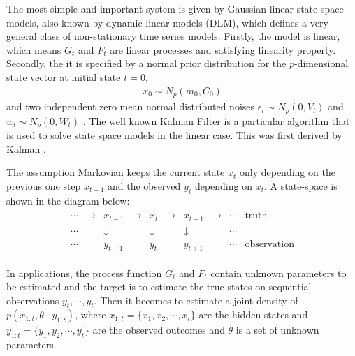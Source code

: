 The most simple and important system is given by Gaussian linear state space models, also known by dynamic linear models (DLM), which defines a very general class of non-stationary time series models.  Firstly, the model is linear, which means $G_t$ and $F_t$ are linear processes and satisfying linearity property. Secondly, the it is specified by a normal prior distribution for the $p$-dimensional state vector at initial state $t=0$, 
\begin{align*}
x_0 \sim N_p(m_0,C_0)
\end{align*} 
and two independent zero mean normal distributed noises $\epsilon_t \sim N_p(0,V_t)$ and $w_t \sim N_p(0,W_t)$ \cite{petris2009dynamic}. The well known Kalman Filter is a particular algorithm that is used to solve state space models in the linear case. This was first derived by Kalman \cite{kalman1960new}.

The assumption Markovian keeps the current state $x_t$ only depending on the previous one step $x_{t-1}$ and the observed $y_t$ depending on $x_t$. A state-space is shown in the diagram below:
\begin{align*}
{\displaystyle {\begin{array}{cccccccccc}\cdots &\to &x_{t-1}&\to &x_{t}&\to &x_{t+1}&\to &\cdots &{\text{truth}}\\ \cdots &&\downarrow &&\downarrow &&\downarrow &&\cdots &\\ \cdots&&y_{t-1}&&y_{t}&&y_{t+1}&&\cdots &{\text{observation}}\end{array}}}
\end{align*}

In applications, the process function $G_t$ and $F_t$ contain unknown parameters to be estimated \cite{de1988likelihood} and the target is to estimate the true states on sequential observations $y_t, \cdots, y_t$. Then it becomes to estimate a joint density of $p(x_{1:t},\theta \mid y_{1:t})$, where $x_{1:t} = \{x_1, x_2, \cdots, x_t \}$ are the hidden states and $y_{1:t} = \{y_1, y_2, \cdots, y_t \}$ are the observed outcomes and $\theta$ is a set of unknown parameters. 


